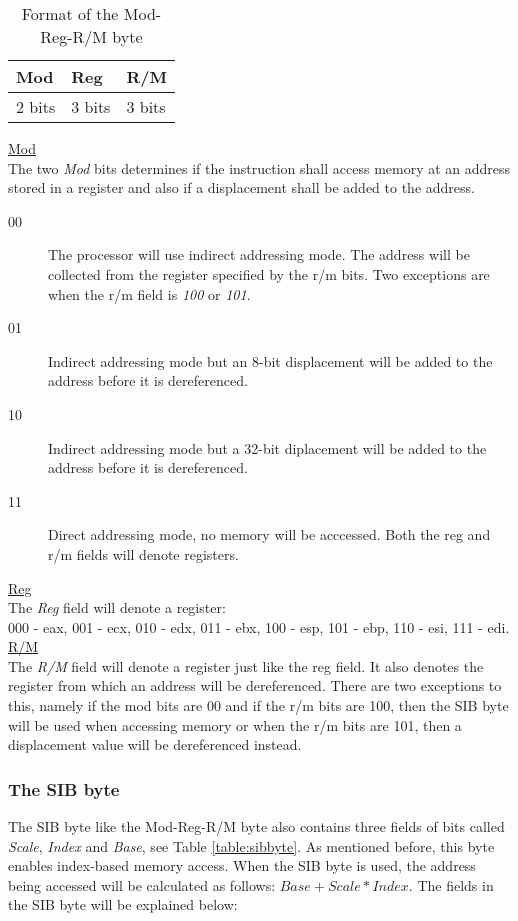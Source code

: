 \documentclass[11pt,twoside]{eitExjobb}
\begin{document}
\begin{table}[h]
\begin{tabular}{|l|l|l|}
\hline
Mod & Reg & R/M \\
\hline
2 bits & 3 bits & 3 bits \\
\hline
\end{tabular}
\caption{Format of the Mod-Reg-R/M byte}
\label{table:modregrmbyte}
\end{table}


\noindent \uline{Mod}\\
The two \emph{Mod} bits determines if the instruction shall access memory at an address stored in a register and also if a displacement shall be added to the address.\\
\begin{description}
\item[00] The processor will use indirect addressing mode. The address will be collected from the register specified by the r/m bits. Two exceptions are when the r/m field is \emph{100} or \emph{101}.  
\item[01] Indirect addressing mode but an 8-bit displacement will be added to the address before it is dereferenced.
\item[10] Indirect addressing mode but a 32-bit diplacement will be added to the address before it is dereferenced.
\item[11] Direct addressing mode, no memory will be acccessed. Both the reg and r/m fields will denote registers.
\end{description}

\noindent \uline{Reg}\\
The \emph{Reg} field will denote a register: \\ 000 - eax, 001 - ecx, 010 - edx, 011 - ebx, 100 - esp, 101 - ebp, 110 - esi, 111 - edi.\\


\noindent \uline{R/M}\\
The \emph{R/M} field will denote a register just like the reg field. It also denotes the register from which an address will be dereferenced. There are two exceptions to this, namely if the mod bits are 00 and if the r/m bits are 100, then the SIB byte will be used when accessing memory or when the r/m bits are 101, then a displacement value will be dereferenced instead.

\subsubsection{The SIB byte}
The SIB byte like the Mod-Reg-R/M byte also contains three fields of bits called \emph{Scale}, \emph{Index} and \emph{Base}, see Table \ref{table:sibbyte}. As mentioned before, this byte enables index-based memory access. When the SIB byte is used, the address being accessed will be calculated as follows:
$Base + Scale*Index$. The fields in the SIB byte will be explained below:\\
\end{document}
